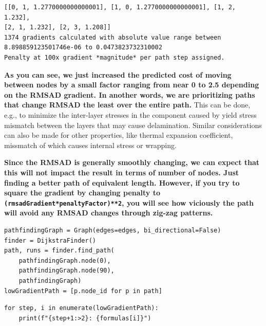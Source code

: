 \begin{verbatim}
[[0, 1, 1.2770000000000001], [1, 0, 1.2770000000000001], [1, 2, 1.232], 
[2, 1, 1.232], [2, 3, 1.208]]
1374 gradients calculated with absolute value range between 
8.898859123501746e-06 to 0.0473823732310002
Penalty at 100x gradient *magnitude* per path step assigned.
\end{verbatim}

\textbf{As you can see, we just increased the predicted cost of moving
between nodes by a small factor ranging from near 0 to 2.5 depending on
the RMSAD gradient. In another words, we are prioritizing paths that
change RMSAD the least over the entire path.} This can be done, e.g., to
minimize the inter-layer stresses in the component caused by yield
stress mismatch between the layers that may cause delamination. Similar
considerations can also be made for other properties, like thermal
expansion coefficient, missmatch of which causes internal stress or
wrapping.

\textbf{Since the RMSAD is generally smoothly changing, we can expect
that this will not impact the result in terms of number of nodes. Just
finding a better path of equivalent length. However, if you try to
square the gradient by changing penalty to
\texttt{(rmsadGradient*penaltyFactor)**2}, you will see
how viciously the path will avoid any RMSAD changes through zig-zag
patterns.}

\begin{verbatim}
pathfindingGraph = Graph(edges=edges, bi_directional=False)
finder = DijkstraFinder()
path, runs = finder.find_path(
    pathfindingGraph.node(0), 
    pathfindingGraph.node(90), 
    pathfindingGraph)
lowGradientPath = [p.node_id for p in path]
\end{verbatim}

\begin{verbatim}
for step, i in enumerate(lowGradientPath):
    print(f"{step+1:>2}: {formulas[i]}")
\end{verbatim}

